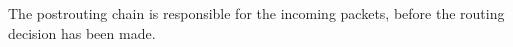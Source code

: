 The postrouting chain is responsible for the incoming packets, before the routing decision has been made.